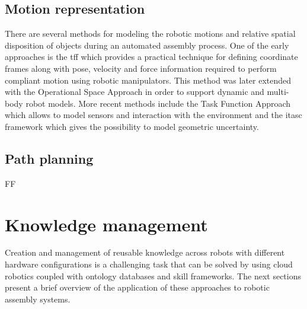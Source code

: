 \subsection{Motion representation}

There are several methods for modeling the robotic motions and relative spatial disposition of objects during an automated assembly process. One of the early approaches is the \gls{tff} \cite{Mason1981,Finkemeyer2004} which provides a practical technique for defining coordinate frames along with pose, velocity and force information required to perform compliant motion using robotic manipulators. This method was later extended with the Operational Space Approach \cite{Khatib1987,DeSapio2006} in order to support dynamic and multi-body robot models. More recent methods include the Task Function Approach \cite{Samson1991} which allows to model sensors and interaction with the environment and the \gls{itasc} framework \cite{DeSchutter-ijrr2007,Smits2010} which gives the possibility to model geometric uncertainty.


\subsection{Path planning}

FF





\section{Knowledge management}

Creation and management of reusable knowledge across robots with different hardware configurations is a challenging task that can be solved by using cloud robotics coupled with ontology databases and skill frameworks. The next sections present a brief overview of the application of these approaches to robotic assembly systems.


